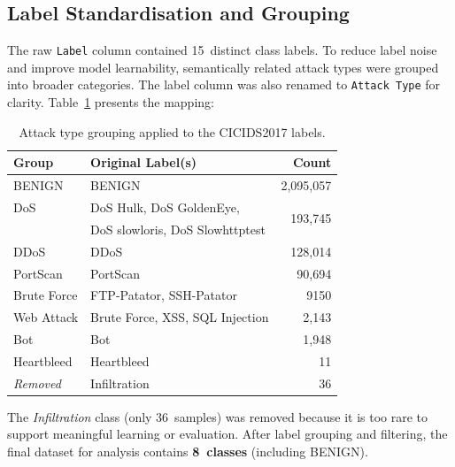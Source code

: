 \documentclass[12pt, a4paper]{article}
\begin{document}
\subsection{Label Standardisation and Grouping}

The raw \texttt{Label} column contained 15~distinct class labels.
To reduce label noise and improve model learnability, semantically related attack types were grouped into broader categories.
The label column was also renamed to \texttt{Attack Type} for clarity.
Table~\ref{tab:label_mapping} presents the mapping:

\begin{table}[H]
\centering
\caption{Attack type grouping applied to the CICIDS2017 labels.}
\label{tab:label_mapping}
\begin{tabular}{@{}llr@{}}
\toprule
\textbf{Group}       & \textbf{Original Label(s)}                                  & \textbf{Count} \\
\midrule
BENIGN               & BENIGN                                                       & 2,095,057 \\
\midrule
DoS                  & DoS Hulk, DoS GoldenEye,                                    & \multirow{2}{*}{193,745} \\
                     & DoS slowloris, DoS Slowhttptest                              & \\
\midrule
DDoS                 & DDoS                                                         & 128,014 \\
PortScan             & PortScan                                                     & 90,694 \\
Brute Force          & FTP-Patator, SSH-Patator                                     & 9150 \\
Web Attack           & Brute Force, XSS, SQL Injection                              & 2,143 \\
Bot                  & Bot                                                          & 1,948 \\
Heartbleed           & Heartbleed                                                   & 11 \\
\midrule
\textit{Removed}     & Infiltration                                                 & 36 \\
\bottomrule
\end{tabular}
\end{table}

\noindent
The \textit{Infiltration} class (only 36~samples) was removed because it is too rare to support meaningful learning or evaluation.
After label grouping and filtering, the final dataset for analysis contains \textbf{8~classes} (including BENIGN).
\end{document}
